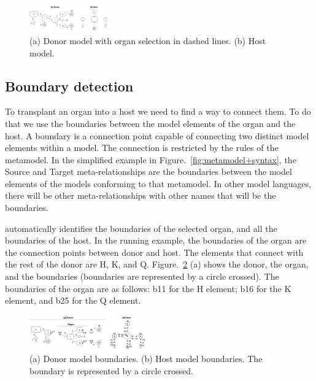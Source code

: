 \begin{figure}[tb]
    \centering
    \includegraphics[width=0.30\textwidth]{Figures/donor+host.png}
    \caption{(a) Donor model with organ selection in dashed lines. (b) Host model.}
    \label{fig:donor_host}
\end{figure}


\subsection{Boundary detection}

To transplant an organ into a host we need to find a way to connect them. To do that we use the boundaries between the model elements of the organ and the host. A boundary is a connection point capable of connecting two distinct model elements within a model. The connection is restricted by the rules of the metamodel. In the simplified example in Figure.~\ref{fig:metamodel+syntax}, the Source and Target meta-relationships are the boundaries between the model elements of the models conforming to that metamodel. In other model languages, there will be other meta-relationships with other names that will be the boundaries.

\ApproachName{} automatically identifies the boundaries of the selected organ, and all the boundaries of the host. In the running example, the boundaries of the organ are the connection points between donor and host. The elements that connect with the rest of the donor are H, K, and Q. Figure.~\ref{fig:org_bound} (a) shows the donor, the organ, and the boundaries (boundaries are represented by a circle crossed). The boundaries of the organ are as follows: b11 for the H element; b16 for the K element, and b25 for the Q element.

\begin{figure}[tb]
    \centering
    \includegraphics[width=0.45\textwidth]{Figures/donor+host+boundaries.png}
    \caption{(a) Donor model boundaries. (b) Host model boundaries. The boundary is represented by a circle crossed.}
    \label{fig:org_bound}
\end{figure}

